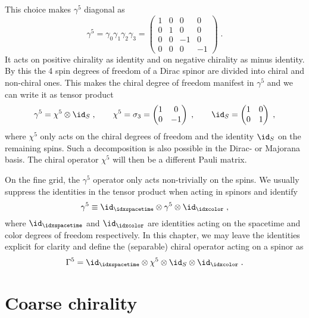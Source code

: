 This choice makes $\gamma^5$ diagonal as
\begin{equation}
\gamma^5 =
\gamma_0 \gamma_1 \gamma_2 \gamma_3 =
\begin{pmatrix}
1 & 0 & 0 & 0 \\
0 & 1 & 0 & 0 \\
0 & 0 & -1 & 0 \\
0 & 0 & 0 & -1
\end{pmatrix} \;.
\end{equation}
It acts on positive chirality as identity and on negative chirality as minus identity.
By this the \num{4} spin degrees of freedom of a Dirac spinor are divided into chiral and non-chiral ones.
This makes the chiral degree of freedom manifest in $\gamma^5$ and we can write it as tensor product
\begin{equation}
\gamma^5 = \chi^5 \otimes \id_S \;,
\qquad
\chi^5 = 
\sigma_3 = 
\begin{pmatrix}
1 & 0 \\
0 & -1
\end{pmatrix} \;,
\qquad
\id_S = 
\begin{pmatrix}
1 & 0 \\
0 & 1
\end{pmatrix} \;,
\end{equation}
where $\chi^5$ only acts on the chiral degrees of freedom and the identity $\id_S$ on the remaining spins.
Such a decomposition is also possible in the Dirac- or Majorana basis.
The chiral operator $\chi^5$ will then be a different Pauli matrix.

On the fine grid, the $\gamma^5$ operator only acts non-trivially on the spins.
We usually suppress the identities in the tensor product when acting in spinors and identify
\begin{equation}
\gamma^5 \equiv \id_{\idxspacetime} \otimes \gamma^5 \otimes \id_{\idxcolor} \;,
\end{equation}
where $\id_{\idxspacetime}$ and $\id_{\idxcolor}$ are identities acting on the spacetime and color degrees of freedom respectively.
In this chapter, we may leave the identities explicit for clarity and define the (separable) chiral operator acting on a spinor as
\begin{equation}
\Gamma^5 = \id_{\idxspacetime} \otimes \chi^5 \otimes \id_S \otimes \id_{\idxcolor} \;.
\end{equation}

\section{Coarse chirality}

